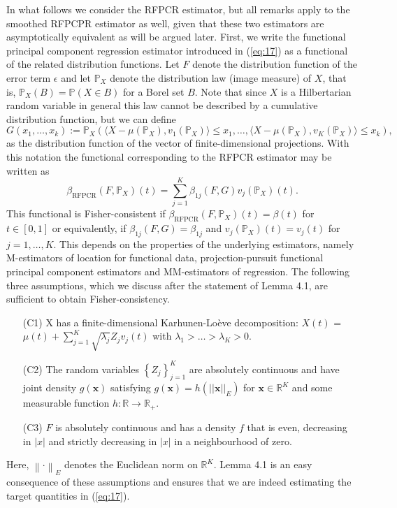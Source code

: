 \documentclass[11pt]{article}
\begin{document}
In what follows we consider the RFPCR estimator, but all remarks apply to the smoothed RFPCPR estimator as well, given that these two estimators are asymptotically equivalent as will be argued later. First, we write the functional principal component regression estimator introduced in (\ref{eq:17}) as a functional of the related distribution functions. Let $F$ denote the distribution function of the error term $\epsilon$ and let $\mathbb{P}_X$ denote the distribution law (image measure) of $X$, that is, $\mathbb{P}_X(B) = \mathbb{P}(X\in B)$ for a Borel set $B$. Note that since $X$ is a Hilbertarian random variable in general this law cannot be described by a cumulative distribution function, but we can define 
\begin{equation*}
G\left(x_1, \ldots, x_k \right) := \mathbb{P}_X \left( \langle X-\mu(\mathbb{P}_X), v_1\left(\mathbb{P}_X\right) \rangle \leq x_1, \ldots, \langle X-\mu(\mathbb{P}_X), v_K\left(\mathbb{P}_X\right) \rangle \leq x_k    \right),
\end{equation*}
as the distribution function of the vector of finite-dimensional projections. With this notation the functional corresponding to the RFPCR estimator may be written as
\begin{equation}
\label{eq:29}
\beta_{{\scriptscriptstyle \text{RFPCR}}} \left(F, \mathbb{P}_X \right)(t)  = \sum_{j=1}^K \beta_{1j} \left(F, G \right) v_j \left(\mathbb{P}_X \right) (t).
\end{equation}
This functional is Fisher-consistent if $\beta_{{\scriptscriptstyle \text{RFPCR}}} \left(F, \mathbb{P}_X  \right)(t) = \beta(t)$ for $t \in[0,1]$ or equivalently, if $\beta_{1j} \left(F, G \right) = \beta_{1j}$ and $v_j \left(\mathbb{P}_X \right)(t) = v_j(t)$ for $j=1, \ldots, K$. This depends on the properties of the underlying estimators, namely M-estimators of location for functional data, projection-pursuit functional principal component estimators and MM-estimators of regression. The following three assumptions, which we discuss after the statement of Lemma 4.1, are sufficient to obtain Fisher-consistency.

\begin{enumerate}
\item[(C1)] X has a finite-dimensional Karhunen-Loève decomposition: $X(t)$ = $\mu(t) + \sum_{j=1}^K \sqrt{\lambda_j} Z_j v_j(t)$ with $ \lambda_1 > \ldots > \lambda_K >0$.
\item[(C2)] The random variables $\left\{Z_j \right\}_{j=1}^K$ are absolutely continuous and have joint density $g\left(\mathbf{x} \right)$ satisfying $g(\mathbf{x}) = h \left(||\mathbf{x}||_{E} \right)$ for $\mathbf{x} \in \mathbb{R}^K$ and some measurable function $h:\mathbb{R} \to \mathbb{R}_{+}$.
\item[(C3)] $F$ is absolutely continuous and has a density $f$ that is even, decreasing in $|x|$ and strictly decreasing in $|x|$ in a neighbourhood of zero.
\end{enumerate}
Here, $\left\| \cdot\right\|_{E}$ denotes the Euclidean norm on $\mathbb{R}^{K}$. Lemma 4.1 is an easy consequence of these assumptions and ensures that we are indeed estimating the target quantities in (\ref{eq:17}). 
\end{document}
